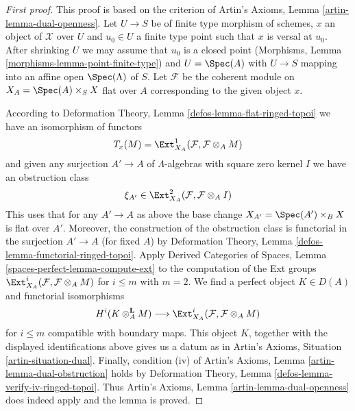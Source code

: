 \begin{proof}[First proof]
This proof is based on the criterion of
Artin's Axioms, Lemma \ref{artin-lemma-dual-openness}.
Let $U \to S$ be of finite type morphism of schemes, $x$ an object of
$\mathcal{X}$ over $U$ and $u_0 \in U$ a finite type point such that
$x$ is versal at $u_0$. After shrinking $U$ we may assume that $u_0$
is a closed point (Morphisms, Lemma \ref{morphisms-lemma-point-finite-type})
and $U = \Spec(A)$ with $U \to S$ mapping into an
affine open $\Spec(\Lambda)$ of $S$.
Let $\mathcal{F}$ be the coherent module on $X_A = \Spec(A) \times_S X$
flat over $A$ corresponding to the given object $x$.

\medskip\noindent
According to Deformation Theory, Lemma \ref{defos-lemma-flat-ringed-topoi}
we have an isomorphism of functors
$$
T_x(M) = \Ext^1_{X_A}(\mathcal{F}, \mathcal{F} \otimes_A M)
$$
and given any surjection $A' \to A$ of $\Lambda$-algebras with square zero
kernel $I$ we have an obstruction class
$$
\xi_{A'} \in \Ext^2_{X_A}(\mathcal{F}, \mathcal{F} \otimes_A I)
$$
This uses that for any $A' \to A$ as above the base change
$X_{A'} = \Spec(A') \times_B X$ is flat over $A'$.
Moreover, the construction of the obstruction class is functorial
in the surjection $A' \to A$ (for fixed $A$) by
Deformation Theory, Lemma \ref{defos-lemma-functorial-ringed-topoi}.
Apply Derived Categories of Spaces, Lemma
\ref{spaces-perfect-lemma-compute-ext}
to the computation of the Ext groups
$\Ext^i_{X_A}(\mathcal{F}, \mathcal{F} \otimes_A M)$
for $i \leq m$ with $m = 2$. We find a perfect object $K \in D(A)$
and functorial isomorphisms
$$
H^i(K \otimes_A^\mathbf{L} M)
\longrightarrow
\Ext^i_{X_A}(\mathcal{F}, \mathcal{F} \otimes_A M)
$$
for $i \leq m$ compatible with boundary maps. This object $K$, together
with the displayed identifications above gives us a datum as in
Artin's Axioms, Situation \ref{artin-situation-dual}.
Finally, condition (iv) of
Artin's Axioms, Lemma \ref{artin-lemma-dual-obstruction}
holds by 
Deformation Theory, Lemma \ref{defos-lemma-verify-iv-ringed-topoi}.
Thus Artin's Axioms, Lemma \ref{artin-lemma-dual-openness}
does indeed apply and the lemma is proved.
\end{proof}

